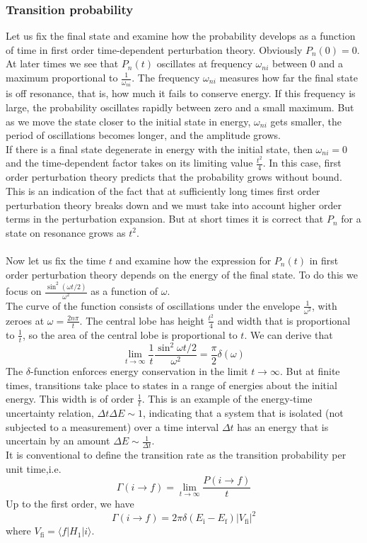 \subsubsection{Transition probability}
Let us fix the final state and examine how the probability develops as a function of time in first order time-dependent perturbation theory.
Obviously $P_n(0) = 0$. At later times we see that $P_n(t)$ oscillates at frequency $\omega_{ni}$ between $0$ and a maximum proportional to $\frac{1}{\omega_{ni}}$.
The frequency $\omega_{ni}$ measures how far the final state is off resonance, that is, how much it fails to conserve energy. If this frequency is large, the probability oscillates rapidly between zero and a small maximum. 
But as we move the state closer to the initial state in energy, $\omega_{ni}$ gets smaller, the period of oscillations becomes longer, and the amplitude grows.\\
If there is a final state degenerate in energy with the initial state, then $\omega_{ni}=0$ and the time-dependent factor takes on its limiting value $\frac{t^2}{4}$. In this case, first order perturbation theory predicts that the probability grows without bound. 
This is an indication of the fact that at sufficiently long times first order perturbation theory breaks down and we must take into account higher order terms in the perturbation expansion. But at short times it is correct that $P_n$ for a state on resonance grows as $t^2$.\\ \\
Now let us fix the time $t$ and examine how the expression for $P_n(t)$ in first order perturbation theory depends on the energy of the final state. To do this we focus on $\frac{\sin^2(\omega t/2)}{\omega^2}$ as a function of $\omega$.\\
The curve of the function consists of oscillations under the envelope $\frac{1}{\omega^2}$, with zeroes at $\omega = \frac{2n\pi}{t}$. The
central lobe has height $\frac{t^2}{4}$ and width that is proportional to $\frac{1}{t}$, so the area of the central lobe
is proportional to $t$. We can derive that
\[\lim_{t \to \infty} \frac{1}{t} \frac{\sin^2\omega t/2}{\omega^2} = \frac{\pi}{2}\delta(\omega)\]
The $\delta$-function enforces energy conservation in the limit $t \to \infty$. But at finite times, transitions take place to states in a range of energies about the initial energy.
This width is of order $\frac{1}{t}$. This is an example of
the energy-time uncertainty relation, $\Delta t \Delta E \sim 1$, indicating that a system that is isolated (not
subjected to a measurement) over a time interval $\Delta t$ has an energy that is uncertain by an amount $\Delta E \sim \frac{1}{\Delta t}$.\\
It is conventional to define the transition rate as the transition probability per unit time,i.e.
\[\Gamma(i \to f) = \lim_{t \to \infty}\frac{P(i \to f)}{t}\]
Up to the first order, we have
\[\Gamma(i \to f) = 2\pi \delta(E_{\mathrm{i}} - E_{\mathrm{f}}) |V_{\mathrm{fi}}|^2\]
where $V_{\mathrm{fi}} = \langle f | H_1 | i \rangle$.

